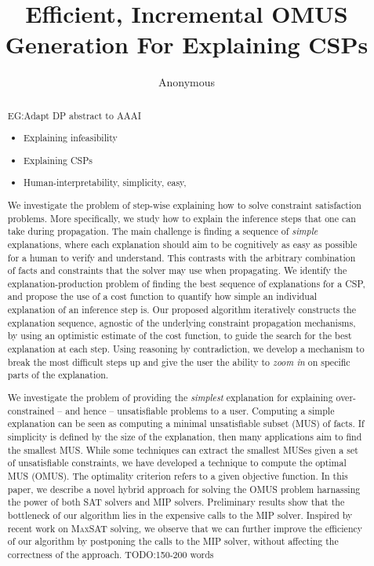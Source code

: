 \documentclass[letterpaper]{article} %
\title{Efficient, Incremental OMUS Generation For Explaining CSPs}
\author{Anonymous}
\newcommand\comment[1]{\marginpar{\tiny #1}}
\renewcommand\comment[1]{#1}
\newcommand{\emilio}[1]{{\comment{\color{orange}\textsc{EG:}#1}}}
\newcommand{\todo}[1]{{\comment{\color{red}\textsc{TODO:}#1} }}
\begin{document}
\maketitle

\begin{abstract}
    \emilio{Adapt DP abstract to AAAI
    \begin{itemize}
        \item Explaining infeasibility
        \item Explaining CSPs
        \item Human-interpretability, simplicity, easy,
    \end{itemize}
    }
    We investigate the problem of step-wise explaining how to solve constraint satisfaction problems.
    More specifically, we study how to explain the inference steps that one can take during propagation.
    The main challenge is finding a sequence of \textit{simple} explanations, where each explanation should aim to be cognitively as easy as possible for a human to verify and understand.
    This contrasts with the arbitrary combination of facts and constraints that the solver may use  when propagating.
    We identify the explanation-production problem of finding the best sequence of explanations for a CSP, and propose the use of a cost function to quantify how simple an individual explanation of an inference step is.
    Our proposed algorithm iteratively constructs the explanation sequence, agnostic of the underlying constraint propagation mechanisms, by using an optimistic estimate of the cost function, to guide the search for the best explanation at each step.
    Using reasoning by contradiction, we develop a mechanism to break the most difficult steps up and give the user the ability to \emph{zoom in} on specific parts of the explanation.

    We investigate the problem of providing the \textit{simplest} explanation for explaining over-constrained -- and hence -- unsatisfiable problems to a user.
    Computing a simple explanation can be seen as computing a minimal unsatisfiable subset (MUS) of facts. 
    If simplicity is defined by the size of the explanation, then many applications aim to find the smallest MUS.
    While some techniques can extract the smallest MUSes given a set of unsatisfiable constraints, we have developed a technique to compute the optimal MUS (OMUS). 
    The optimality criterion refers to a given objective function.
    In this paper, we describe a novel hybrid approach for solving the OMUS problem harnassing the power of both SAT solvers and MIP solvers.
    Preliminary results show that the bottleneck of our algorithm lies in the expensive calls to the MIP solver.
    Inspired by recent work on \textsc{MaxSAT} solving, we observe that we can further improve the efficiency of our algorithm by postponing the calls to the MIP solver, without affecting the correctness of the approach.
    \todo{150-200 words}

\end{abstract}
\end{document}
